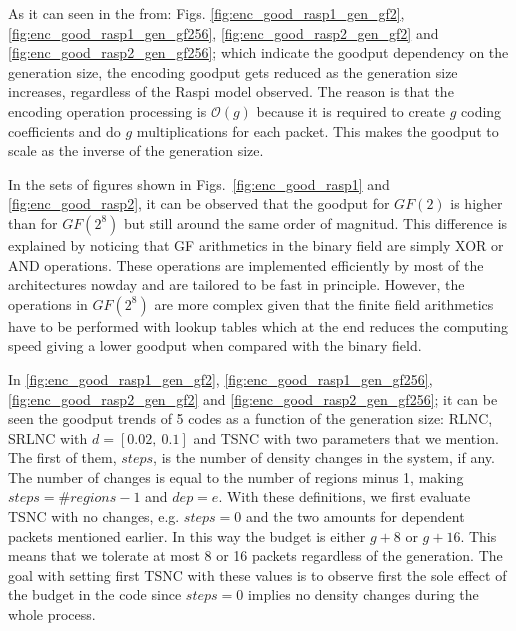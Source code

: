 %
As it can seen in the from: Figs. \ref{fig:enc_good_rasp1_gen_gf2},
\ref{fig:enc_good_rasp1_gen_gf256}, \ref{fig:enc_good_rasp2_gen_gf2} and
\ref{fig:enc_good_rasp2_gen_gf256}; which indicate the goodput dependency
on the generation size, the encoding goodput gets reduced as the generation
size increases, regardless of the \ac{Raspi} model observed. The reason
is that the encoding operation processing is $\mathcal{O}(g)$ because
it is required to create $g$ coding coefficients and do $g$ multiplications
for each packet. This makes the goodput to scale as the inverse of the
generation size.

In the sets of figures shown in Figs.~\ref{fig:enc_good_rasp1} and
\ref{fig:enc_good_rasp2}, it can be observed that the goodput for $GF(2)$
is higher than for $GF(2^8)$ but still around the same order of magnitud.
This difference is explained by noticing that \ac{GF} arithmetics in the
binary field are simply XOR or AND operations. These operations are
implemented efficiently by most of the architectures nowday and are
tailored to be fast in principle. However, the operations in $GF(2^8)$
are more complex given that the finite field arithmetics have to be
performed with lookup tables which at the end reduces the computing
speed giving a lower goodput when compared with the binary field.

In \ref{fig:enc_good_rasp1_gen_gf2}, \ref{fig:enc_good_rasp1_gen_gf256},
\ref{fig:enc_good_rasp2_gen_gf2} and \ref{fig:enc_good_rasp2_gen_gf256};
it can be seen the goodput trends of 5 codes as a function of
the generation size: \ac{RLNC}, \ac{SRLNC} with $d = [0.02,\ 0.1]$
and \ac{TSNC} with two parameters that we mention. The first of them,
$steps$, is the number of density changes in the system, if any.
The number of changes is equal to the number of regions minus 1, making
$steps = \#regions - 1$ and $dep = e$. With these definitions, we first
evaluate \ac{TSNC} with no changes, e.g. $steps=0$ and the two amounts
for dependent packets mentioned earlier. In this way the budget is
either $g + 8$ or $g + 16$. This means that we tolerate at most 8 or 16
packets regardless of the generation. The goal with setting first
\ac{TSNC} with these values is to observe first the sole effect of the
budget in the code since $steps = 0$ implies no density changes during
the whole process.

